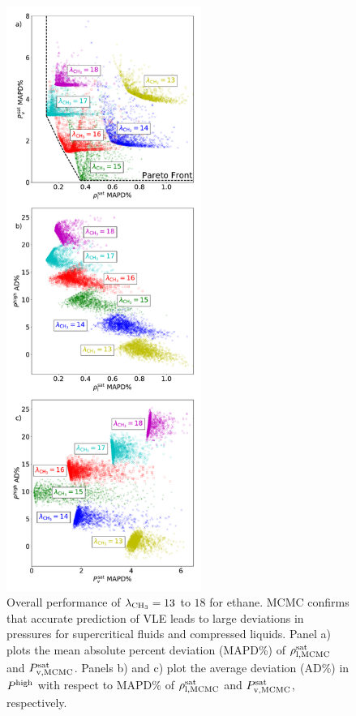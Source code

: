 \documentclass[preprint,letterpaper,floatfix,citeautoscript,aip,jcp]{revtex4-1}
\begin{document}
\begin{figure}[p!]
	\centering
	\includegraphics[width=2.5in]{MCMC_Mie_13_14_15_16_17_18_ethane_Pareto}
	\caption{Overall performance of $\lambda_{\rm CH_3} = 13$ to $18$ for ethane. MCMC confirms that accurate prediction of VLE leads to large deviations in pressures for supercritical fluids and compressed liquids. Panel a) plots the mean absolute percent deviation (MAPD\%) of $\rho_{\rm l, MCMC}^{\rm sat}$ and $P_{\rm v, MCMC}^{\rm sat}$. Panels b) and c) plot the average deviation (AD\%) in $P^{\rm high}$ with respect to MAPD\% of $\rho_{\rm l, MCMC}^{\rm sat}$ and $P_{\rm v, MCMC}^{\rm sat}$, respectively.}
	\label{fig:MCMC_Mie_13_14_15_16_17_18_ethane_Pareto}
\end{figure} 
\end{document}
